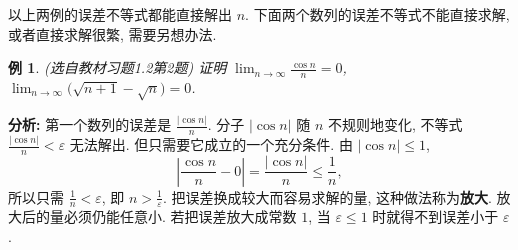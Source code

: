 \documentclass[UTF8,openany]{ctexbook}
\theoremstyle{chinesetextbook}
\newtheorem{example}{例}[section]
\begin{document}
以上两例的误差不等式都能直接解出 $n$. 下面两个数列的误差不等式不能直接求解, 或者直接求解很繁, 需要另想办法.
\begin{example}\label{ex:h12-2}
\textnormal{(选自教材习题1.2第2题)} 证明 $\displaystyle\lim_{n\to\infty}\frac{\cos n}n=0$, $\displaystyle\lim_{n\to\infty}\bigl(\sqrt{n+1}-\sqrt n\bigr)=0$.
\end{example}
\par\indent\textbf{分析:} 第一个数列的误差是 $\displaystyle\frac{|\cos n|}n$. 分子 $|\cos n|$ 随 $n$ 不规则地变化, 不等式 $\displaystyle\frac{|\cos n|}n<\varepsilon$ 无法解出. 但只需要它成立的一个充分条件. 由 $|\cos n|\le1$,
\[
\left|\frac{\cos n}n-0\right|=\frac{|\cos n|}n\le\frac1n,
\]
所以只需 $\displaystyle\frac1n<\varepsilon$, 即 $\displaystyle n>\frac1\varepsilon$. 把误差换成较大而容易求解的量, 这种做法称为\textbf{放大}. 放大后的量必须仍能任意小. 若把误差放大成常数 $1$, 当 $\varepsilon\le1$ 时就得不到误差小于 $\varepsilon$.
\end{document}
